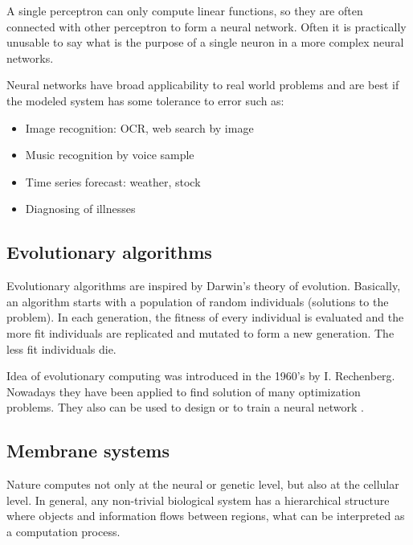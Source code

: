A single perceptron can only compute linear functions, so they are often connected with other perceptron to form a neural network. Often it is practically unusable to say what is the purpose of a single neuron in a more complex neural networks.

Neural networks have broad applicability to real world problems and are best if the modeled system has some tolerance to error such as:
\begin{itemize}
  \item Image recognition: OCR, web search by image
  \item Music recognition by voice sample
  \item Time series forecast: weather, stock
  \item Diagnosing of illnesses
\end{itemize}


\subsection{Evolutionary algorithms} %
\label{sub:evolutionary_algorithms}

Evolutionary algorithms are inspired by Darwin's theory of evolution. Basically, an algorithm starts with a population of random individuals (solutions to the problem). In each generation, the fitness of every individual is evaluated and the more fit individuals are replicated and mutated to form a new generation. The less fit individuals die.

Idea of evolutionary computing was introduced in the 1960's by I. Rechenberg. Nowadays they have been applied to find solution of many optimization problems. They also can be used to design or to train a neural network \cite{Montana:1989:TrainNeuronByGenetic}.



\subsection{Membrane systems} %
\label{sub:membrane_systems}

Nature computes not only at the neural or genetic level, but also at the cellular level. In general, any non-trivial biological system has a hierarchical structure where objects and information flows between regions, what can be interpreted as a computation process.

